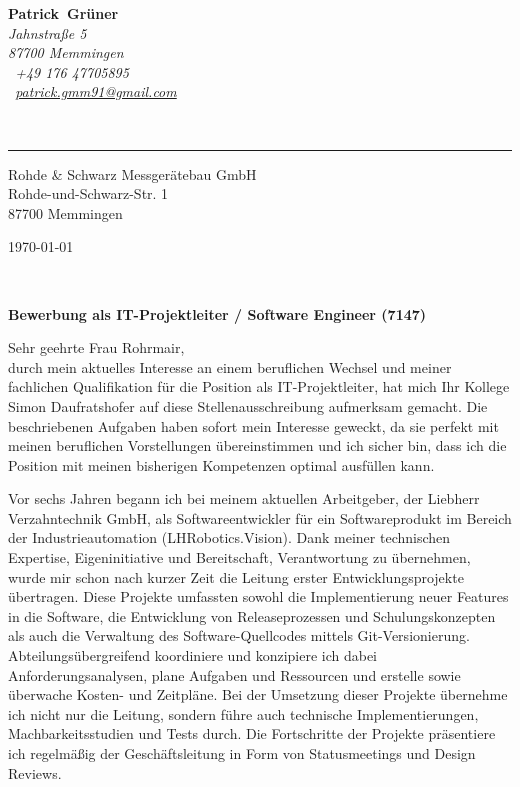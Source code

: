 \documentclass[10pt,a4paper]{article}
\def\firstname{Patrick}
\def\familyname{Grüner}
\begin{document}
\sffamily   %
\hfill%
\begin{minipage}[t]{.6\textwidth}
	\raggedleft%
	{\bfseries {\color{firstnamecolor}\firstname}~{\color{familynamecolor}\familyname}}\\[.35ex]
	\small\itshape%
	Jahnstraße 5\\
	87700 Memmingen\\[.35ex]
	\Mobilefone~+49 176 47705895\\
	\Letter~\href{mailto:patrick.gmm91@gmail.com}{patrick.gmm91@gmail.com}
\end{minipage}\\[0.5em]
%
{\color{firstnamecolor}\rule{\textwidth}{.25ex}}
%
\begin{minipage}[t]{.5\textwidth}
	\raggedright%
	\vspace*{1em}
	Rohde \& Schwarz Messgerätebau GmbH\\[.35ex]
	\small%
	Rohde-und-Schwarz-Str. 1\\
	87700 Memmingen
\end{minipage}
%
\hfill
%
\begin{minipage}[t]{.4\textwidth}
	\raggedleft %
	\today
\end{minipage}\\[1em]
\raggedright

{\bfseries \color{familynamecolor}Bewerbung als IT-Projektleiter / Software Engineer (7147)\\[1.5em]}

Sehr geehrte Frau Rohrmair,\\[1em]
%
durch mein aktuelles Interesse an einem beruflichen Wechsel und meiner fachlichen Qualifikation für die Position als IT-Projektleiter, hat mich Ihr Kollege Simon Daufratshofer auf diese Stellenausschreibung aufmerksam gemacht. Die beschriebenen Aufgaben haben sofort mein Interesse geweckt, da sie perfekt mit meinen beruflichen Vorstellungen übereinstimmen und ich sicher bin, dass ich die Position mit meinen bisherigen Kompetenzen optimal ausfüllen kann.

Vor sechs Jahren begann ich bei meinem aktuellen Arbeitgeber, der Liebherr Verzahntechnik GmbH, als Softwareentwickler für ein Softwareprodukt im Bereich der Industrieautomation (LHRobotics.Vision). Dank meiner technischen Expertise, Eigeninitiative und Bereitschaft, Verantwortung zu übernehmen, wurde mir schon nach kurzer Zeit die Leitung erster Entwicklungsprojekte übertragen. Diese Projekte umfassten sowohl die Implementierung neuer Features in die Software, die Entwicklung von Releaseprozessen und Schulungskonzepten als auch die Verwaltung des Software-Quellcodes mittels Git-Versionierung. Abteilungsübergreifend koordiniere und konzipiere ich dabei Anforderungsanalysen, plane Aufgaben und Ressourcen und erstelle sowie überwache Kosten- und Zeitpläne. Bei der Umsetzung dieser Projekte übernehme ich nicht nur die Leitung, sondern führe auch technische Implementierungen, Machbarkeitsstudien und Tests durch. Die Fortschritte der Projekte präsentiere ich regelmäßig der Geschäftsleitung in Form von Statusmeetings und Design Reviews.
\end{document}
